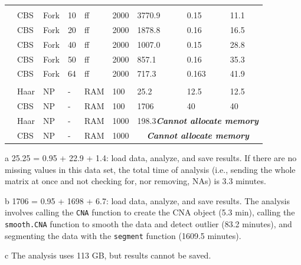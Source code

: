 \documentclass[a4paper,11pt]{article}
\newcounter{magicrownumbers}
\newcommand\rownumber{\stepcounter{magicrownumbers}\arabic{magicrownumbers}}
\begin{document}
\begin{center}
\begin{threeparttable}
\begin{tabular}{lp{1.3cm}p{1.2cm}p{1.0cm}p{0.85cm}p{1.2cm}p{1.9cm}p{1.55cm}p{1.8cm}}
&&&&&&&\\
\rownumber&CBS & Fork &10  & ff & 2000 &3770.9 & 0.15 & 11.1 \\
\rownumber&CBS & Fork &20 & ff & 2000 & 1878.8 & 0.16 & 16.5 \\
\rownumber&CBS & Fork &40  & ff & 2000 & 1007.0 & 0.15 & 28.8 \\
\rownumber&CBS & Fork &50  & ff & 2000 & 857.1 & 0.16 & 35.3 \\
\rownumber&CBS & Fork & 64  & ff & 2000 & 717.3 & 0.163 & 41.9 \\

&&&&&&&\\


\rownumber&Haar & NP &-  &RAM  & 100 &  25.2\tnote{a}   & 12.5 & 12.5  \\
\rownumber&CBS     & NP &-  &RAM  & 100 & 1706\tnote{b}  &   40   &  40\\
\rownumber&Haar & NP &-  &RAM  & 1000 &
\multicolumn{3}{c}{198.3\tnote{c}\quad \textit{\textbf{Cannot allocate memory}}} \\
\rownumber&CBS     & NP &-  &RAM  & 1000 & \multicolumn{3}{c}{\textit{\qquad\textbf{Cannot allocate memory}}}\\

\hline
   
  \end{tabular}

  \begin{tablenotes}
    {\footnotesize

     \item[a] 25.25 = 0.95 + 22.9 + 1.4: load data, analyze, and save results.%
      If there are no missing values in this data set, the total time of
      analysis (i.e., sending the whole matrix at once and not checking
      for, nor removing, NAs) is 3.3 minutes.
    \item[b] 1706 =  0.95 + 1698 + 6.7: load data, analyze, and save results. The
      analysis involves calling the \texttt{CNA} function to create the CNA object
      (5.3 min), calling the \texttt{smooth.CNA} function to smooth the data
      and detect outlier (83.2 minutes), and segmenting the data with the
      \texttt{segment} function (1609.5 minutes).
    \item[c] The analysis uses 113 GB, but results cannot be saved.
      }
  \end{tablenotes}

\end{threeparttable}
\end{center}
\end{document}

